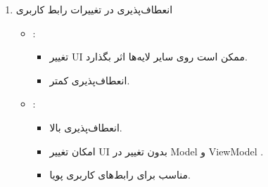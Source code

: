 \begin{enumerate}
\begin{itemize}
    \item {:}
    \begin{itemize}
    \item پیچیده‌تر.
    \item نیازمند مفاهیمی مانند  و .
    \item دارای سربار اولیه بیشتر.
    \end{itemize}
    \end{itemize}
    
    \item {انعطاف‌پذیری در تغییرات رابط کاربری}
    \begin{itemize}
    \item {}:
    \begin{itemize}
    \item تغییر UI ممکن است روی سایر لایه‌ها اثر بگذارد.
    \item انعطاف‌پذیری کمتر.
    \end{itemize}
    
    \item {:}
    \begin{itemize}
    \item انعطاف‌پذیری بالا.
    \item امکان تغییر UI بدون تغییر در Model و ViewModel .
    \item مناسب برای رابط‌های کاربری پویا.
    \end{itemize}
    \end{itemize}
    
    \end{enumerate}